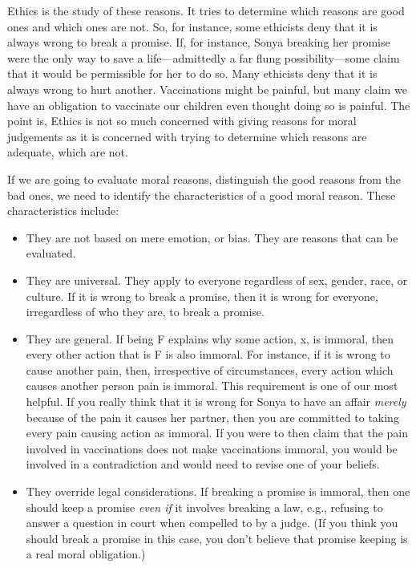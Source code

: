 \documentclass[]{article}
\begin{document}
Ethics is the study of these reasons. It tries to determine which
reasons are good ones and which ones are not. So, for instance, some
ethicists deny that it is always wrong to break a promise. If, for
instance, Sonya breaking her promise were the only way to save a
life---admittedly a far flung possibility---some claim that it would be
permissible for her to do so. Many ethicists deny that it is always
wrong to hurt another. Vaccinations might be painful, but many claim we
have an obligation to vaccinate our children even thought doing so is
painful. The point is, Ethics is not so much concerned with giving
reasons for moral judgements as it is concerned with trying to determine
which reasons are adequate, which are not.

If we are going to evaluate moral reasons, distinguish the good reasons
from the bad ones, we need to identify the characteristics of a good
moral reason. These characteristics include:

\begin{itemize}
\itemsep1pt\parskip0pt
\item
  They are not based on mere emotion, or bias. They are reasons that can
  be evaluated.\\
\item
  They are universal. They apply to everyone regardless of sex, gender,
  race, or culture. If it is wrong to break a promise, then it is wrong
  for everyone, irregardless of who they are, to break a promise.
\item
  They are general. If being F explains why some action, x, is immoral,
  then every other action that is F is also immoral. For instance, if it
  is wrong to cause another pain, then, irrespective of circumstances,
  every action which causes another person pain is immoral. This
  requirement is one of our most helpful. If you really think that it is
  wrong for Sonya to have an affair \emph{merely} because of the pain it
  causes her partner, then you are committed to taking every pain
  causing action as immoral. If you were to then claim that the pain
  involved in vaccinations does not make vaccinations immoral, you would
  be involved in a contradiction and would need to revise one of your
  beliefs.\\
\item
  They override legal considerations. If breaking a promise is immoral,
  then one should keep a promise \emph{even if} it involves breaking a
  law, e.g., refusing to answer a question in court when compelled to by
  a judge. (If you think you should break a promise in this case, you
  don't believe that promise keeping is a real moral obligation.)
\end{itemize}
\end{document}
